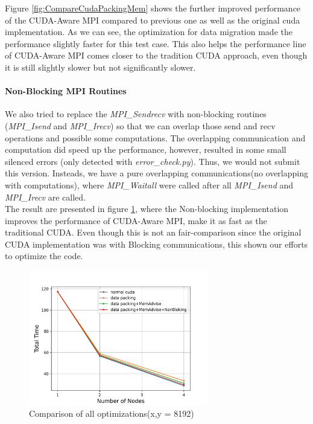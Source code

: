 \documentclass[article]{scrartcl}
\begin{document}
Figure \ref{fig:CompareCudaPackingMem} shows the further improved performance of the CUDA-Aware MPI compared to previous one as well as the original cuda implementation. As we can see, the optimization for data migration made the performance slightly faster for this test case. This also helps the performance line of CUDA-Aware MPI comes closer to the tradition CUDA approach, even though it is still slightly slower but not significantly slower.


\paragraph{Non-Blocking MPI Routines}
We also tried to replace the \textit{MPI\_Sendrecv} with non-blocking routines (\textit{MPI\_Isend} and \textit{MPI\_Irecv}) so that we can overlap those send and recv operations and possible some computations. The overlapping communication and computation did speed up the performance, however, resulted in some small silenced errors (only detected with \textit{error\_check.py}). Thus, we would not submit this version. Insteads, we have a pure overlapping communications(no overlapping with computations), where \textit{MPI\_Waitall} were called after all \textit{MPI\_Isend} and \textit{MPI\_Irecv} are called. \\

The result are presented in figure \ref{fig:CompareCudaPackingMemNonBlock}, where the Non-blocking implementation improves the performance of CUDA-Aware MPI, make it as fast as the traditional CUDA. Even though this is not an fair-comparison since the original CUDA implementation was with Blocking communications, this shown our efforts to optimize the code.
\begin{figure}[htpb]
	\centering
	\includegraphics[width=0.7\textwidth,keepaspectratio=true]{../figs/Comparison_CUDA_PACKING_MemAdvise_NonBlocking.png}
	\caption{Comparison of all optimizations(x,y = 8192) }
	\label{fig:CompareCudaPackingMemNonBlock}
\end{figure}
\end{document}
